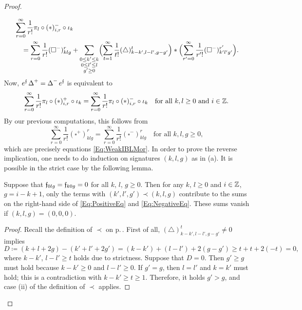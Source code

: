 \documentclass[\MainFolder/Text.tex]{subfiles}
\begin{document}
\begin{proof}
\begin{ProofList}
\begin{equation}
\begin{aligned}
&\sum_{r=0}^\infty \frac{1}{r!} \pi_l \circ (*)_{i,r}^- \circ \iota_k \\
&\quad = \sum_{r=0}^\infty \frac{1}{r!} (\square^-)_{klg}^r + \sum_{\substack{0\le k' \le k \\ 0\le l'\le l \\ g'\ge 0}}\Bigl(\sum_{t=1}^\infty \frac{1}{t!}(\triangle)_{k-k',l-l',g-g'}^{t}\Bigr)*\Bigl(\sum_{r' = 0}^\infty \frac{1}{r'!} (\square^-)_{k'l'g'}^{r'}\Bigr).
\end{aligned}\end{equation}
Now, $e^{\mathfrak{f}}\operatorname{\Delta}^+ = \operatorname{\Delta}^- e^{\mathfrak{f}}$ is equivalent to 
\begin{equation}\label{Eq:SequenceOfEquations}
\sum_{r=0}^\infty \frac{1}{r!} \pi_l \circ (*)^+_{i,r} \circ \iota_k = \sum_{r=0}^\infty \frac{1}{r!}\pi_l \circ (*)^-_{i,r} \circ \iota_k\quad\text{for all }k, l \ge 0\text{ and }i\in \mathbb{Z}.
\end{equation}
By our previous computations, this follows from
\[ \sum_{r=0}^\infty \frac{1}{r!} (\square^+)_{klg}^r = \sum_{r=0}^\infty \frac{1}{r!} (\square^-)_{klg}^r\quad \text{for all }k, l, g\ge 0, \]
which are precisely equations \eqref{Eq:WeakIBLMor}. In order to prove the reverse implication, one needs to do induction on signatures $(k,l,g)$ as in (a). It is possible in the strict case by the following lemma.
\begin{SubClaim}
Suppose that $\mathfrak{f}_{0lg} = \mathfrak{f}_{k0g} = 0$ for all $k$, $l$, $g\ge 0$. Then for any $k$, $l\ge 0$ and $i\in\mathbb{Z}$, $g=i-k+1$, only the terms with $(k',l',g')\prec(k,l,g)$ contribute to the sums on the right-hand side of \eqref{Eq:PositiveEq} and \eqref{Eq:NegativeEq}. These sums vanish if $(k,l,g) = (0,0,0)$.
\end{SubClaim}
\begin{proof}
Recall the definition of $\prec$ on p.\,\pageref{Enum:OrderingOfSignatures}. First of all, $(\triangle)_{k-k',l-l',g-g'}^t \neq 0$ implies
\[ D\coloneqq (k+l+2g) - (k' + l' + 2 g') = (k-k') + (l-l') + 2(g-g') \ge t + t + 2(-t) = 0, \]
where $k-k'$, $l-l'\ge t$ holds due to strictness. Suppose that $D=0$. Then $g'\ge g$ must hold because $k-k'\ge 0$ and $l-l'\ge 0$. If $g'=g$, then $l=l'$ and $k=k'$ must hold; this is a contradiction with $k-k'\ge t \ge 1$. Therefore, it holds $g'>g$, and case (ii) of the definition of $\prec$ applies.


\end{proof}
\end{ProofList}
\end{proof}
\end{document}
